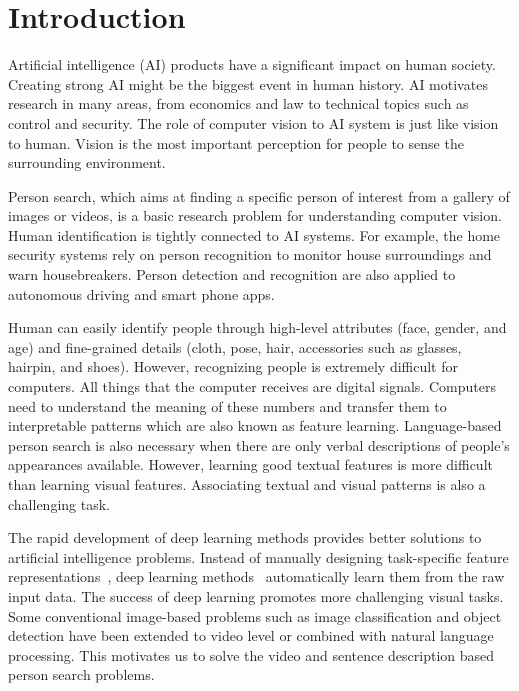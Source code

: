\chapter{Introduction}
\label{ch:introduction}

Artificial intelligence (AI) products have a significant impact on human society. Creating strong AI might be the biggest event in human history. AI motivates research in many areas, from economics and law to technical topics such as control and security. The role of computer vision to AI system is just like vision to human. Vision is the most important perception for people to sense the surrounding environment.

Person search, which aims at finding a specific person of interest from a gallery of images or videos, is a basic research problem for understanding computer vision. Human identification is tightly connected to AI systems. For example, the home security systems rely on person recognition to monitor house surroundings and warn housebreakers. Person detection and recognition are also applied to autonomous driving and smart phone apps.

Human can easily identify people through high-level attributes (face, gender, and age) and fine-grained details (cloth, pose, hair, accessories such as glasses, hairpin, and shoes). However, recognizing people is extremely difficult for computers. All things that the computer receives are digital signals. Computers need to understand the meaning of these numbers and transfer them to interpretable patterns which are also known as feature learning. Language-based person search is also necessary when there are only verbal descriptions of people's appearances available. However, learning good textual features is more difficult than learning visual features. Associating textual and visual patterns is also a challenging task.

The rapid development of deep learning methods provides better solutions to artificial intelligence problems. Instead of manually designing task-specific feature representations~\cite{lowe2004distinctive,dalal2005histograms,farenzena2010person,liao2015person}, deep learning methods~\cite{krizhevsky2012imagenet,simonyan2014very,szegedy2014going,he2015deep} automatically learn them from the raw input data. The success of deep learning promotes more challenging visual tasks. Some conventional image-based problems such as image classification and object detection have been extended to video level or combined with natural language processing. This motivates us to solve the video and sentence description based person search problems.

